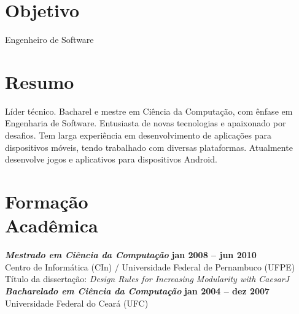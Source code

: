 \documentclass[margin, 10pt]{res} %
\begin{document}
\begin{resume}

 \vspace{-0.05in}
\section{Objetivo}  

Engenheiro de Software

 
\section{Resumo}  

Líder técnico. Bacharel e mestre em Ciência da Computação, com ênfase em Engenharia de Software. Entusiasta de novas tecnologias e apaixonado por desafios. Tem larga experiência em desenvolvimento de aplicações para dispositivos móveis, tendo trabalhado com diversas plataformas. Atualmente desenvolve jogos e aplicativos para dispositivos Android.


\section{Formação \\ Acadêmica}

{\sl\bf Mestrado em Ciência da Computação} \hfill {\bf jan 2008 -- jun 2010} \\
Centro de Informática (CIn) / Universidade Federal de Pernambuco (UFPE) \\
Título da dissertação: {\sl Design Rules for Increasing Modularity with CaesarJ}
\vspace{0.1in}
\\{\sl\bf Bacharelado em Ciência da Computação} \hfill {\bf jan 2004 -- dez 2007} \\
Universidade Federal do Ceará (UFC)  
 

\end{resume}
\end{document}
